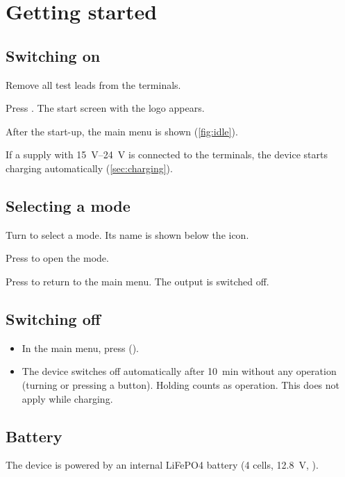 \section{Getting started}
\label{sec:start}

\subsection{Switching on}
\begin{steps}
    \item Remove all test leads from the terminals.
    \item Press . The start screen with the \ST{} logo appears.
    \item After the start-up, the main menu is shown (\autoref{fig:idle}).
\end{steps}

\begin{note}
    If a supply with \qtyrange{15}{24}{\volt} is connected to the terminals, the device starts
    charging automatically (\autoref{sec:charging}).
\end{note}

\subsection{Selecting a mode}
\begin{steps}
    \item Turn \enc{} to select a mode. Its name is shown below the icon.
    \item Press  to open the mode.
    \item Press  to return to the main menu. The output is switched off.
\end{steps}

\subsection{Switching off}
\begin{itemize}
    \item In the main menu, press  ().
    \item The device switches off automatically after \qty{10}{\minute} without any operation
          (turning \enc{} or pressing a button). Holding  counts as operation.
          This does not apply while charging.
\end{itemize}

\subsection{Battery}
The device is powered by an internal \ac{LiFePO4} battery
(4 cells, \qty{12.8}{\volt}, ).
